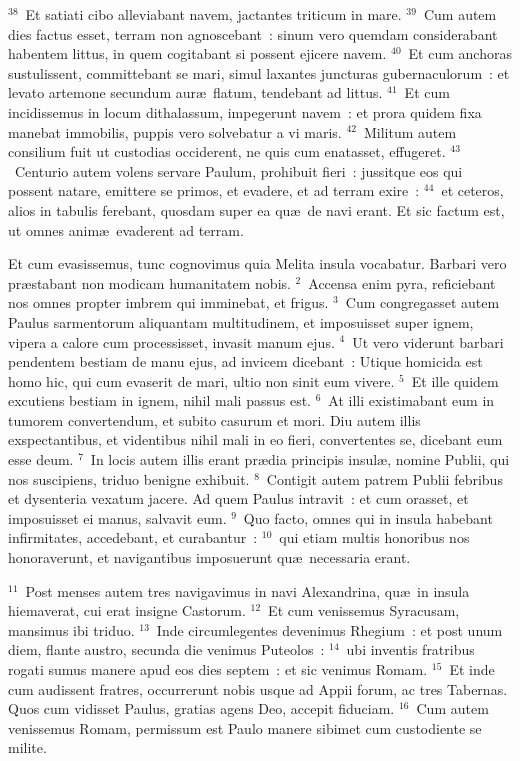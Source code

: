 ${}^{38}$~Et satiati cibo alleviabant navem, jactantes triticum in mare.
${}^{39}$~Cum autem dies factus esset, terram non agnoscebant~: sinum vero quemdam considerabant habentem littus, in quem cogitabant si possent ejicere navem.
${}^{40}$~Et cum anchoras sustulissent, committebant se mari, simul laxantes juncturas gubernaculorum~: et levato artemone secundum aur\ae\ flatum, tendebant ad littus.
${}^{41}$~Et cum incidissemus in locum dithalassum, impegerunt navem~: et prora quidem fixa manebat immobilis, puppis vero solvebatur a vi maris.
${}^{42}$~Militum autem consilium fuit ut custodias occiderent, ne quis cum enatasset, effugeret.
${}^{43}$~Centurio autem volens servare Paulum, prohibuit fieri~: jussitque eos qui possent natare, emittere se primos, et evadere, et ad terram exire~:
${}^{44}$~et ceteros, alios in tabulis ferebant, quosdam super ea qu\ae\ de navi erant. Et sic factum est, ut omnes anim\ae\ evaderent ad terram.

\lettrine[lines=3,image=true,loversize=0.05,lraise=-0.03]{E}{}t cum evasissemus, tunc cognovimus quia Melita insula vocabatur. Barbari vero pr\ae stabant non modicam humanitatem nobis.
${}^{2}$~Accensa enim pyra, reficiebant nos omnes propter imbrem qui imminebat, et frigus.
${}^{3}$~Cum congregasset autem Paulus sarmentorum aliquantam multitudinem, et imposuisset super ignem, vipera a calore cum processisset, invasit manum ejus.
${}^{4}$~Ut vero viderunt barbari pendentem bestiam de manu ejus, ad invicem dicebant~: Utique homicida est homo hic, qui cum evaserit de mari, ultio non sinit eum vivere.
${}^{5}$~Et ille quidem excutiens bestiam in ignem, nihil mali passus est.
${}^{6}$~At illi existimabant eum in tumorem convertendum, et subito casurum et mori. Diu autem illis exspectantibus, et videntibus nihil mali in eo fieri, convertentes se, dicebant eum esse deum.
${}^{7}$~In locis autem illis erant pr\ae dia principis insul\ae , nomine Publii, qui nos suscipiens, triduo benigne exhibuit.
${}^{8}$~Contigit autem patrem Publii febribus et dysenteria vexatum jacere. Ad quem Paulus intravit~: et cum orasset, et imposuisset ei manus, salvavit eum.
${}^{9}$~Quo facto, omnes qui in insula habebant infirmitates, accedebant, et curabantur~:
${}^{10}$~qui etiam multis honoribus nos honoraverunt, et navigantibus imposuerunt qu\ae\ necessaria erant.


${}^{11}$~Post menses autem tres navigavimus in navi Alexandrina, qu\ae\ in insula hiemaverat, cui erat insigne Castorum.
${}^{12}$~Et cum venissemus Syracusam, mansimus ibi triduo.
${}^{13}$~Inde circumlegentes devenimus Rhegium~: et post unum diem, flante austro, secunda die venimus Puteolos~:
${}^{14}$~ubi inventis fratribus rogati sumus manere apud eos dies septem~: et sic venimus Romam.
${}^{15}$~Et inde cum audissent fratres, occurrerunt nobis usque ad Appii forum, ac tres Tabernas. Quos cum vidisset Paulus, gratias agens Deo, accepit fiduciam.
${}^{16}$~Cum autem venissemus Romam, permissum est Paulo manere sibimet cum custodiente se milite.


